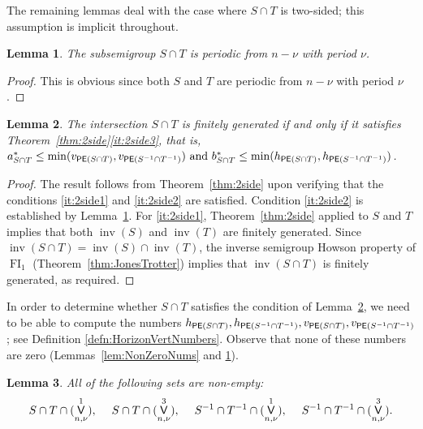 \documentclass[reqno]{amsart}
\theoremstyle{plain}
\newtheorem{lem}{Lemma}[section]
\theoremstyle{definition}
\DeclareMathOperator{\inv}{inv}
\DeclareMathOperator{\FI}{FI}
\let\P\relax
\DeclareMathOperator{\P}{\textup{\textsf{P}}}
\DeclareMathOperator{\PE}{\textup{\textsf{PE}}}
\DeclareMathOperator{\V}{\textup{\textsf{V}}}
\numberwithin{equation}{section}
\begin{document}
The remaining lemmas deal
with the case where $S\cap T$ is two-sided; this assumption is implicit throughout.

\begin{lem}
\label{lem:FGIP2SideIntersectPeriod}
The subsemigroup $S\cap T$ is periodic from $n-\nu$ with period $\nu$.
\end{lem}
\begin{proof}
This is obvious since both $S$ and $T$ are periodic from $n-\nu$ with period $\nu$.
\end{proof}


\begin{lem}
\label{lem:FGIP2sideIntersect1}
The intersection $S\cap T$ is finitely generated if and only if it satisfies Theorem~\ref{thm:2side}\ref{it:2side3}, that is, $a_{S\cap T}^\ast \leq \min(v_{\PE(S\cap T)}, v_{\PE(S^{-1}\cap T^{-1})}) \text{ and } b_{S\cap T}^\ast \leq \min(h_{\PE(S\cap T)}, h_{\PE(S^{-1}\cap T^{-1})})$.
\end{lem}

\begin{proof}
The result follows from Theorem~\ref{thm:2side} upon verifying that the conditions \ref{it:2side1} and \ref{it:2side2} are satisfied. Condition \ref{it:2side2} is established by Lemma~\ref{lem:FGIP2SideIntersectPeriod}. For \ref{it:2side1}, Theorem~\ref{thm:2side} applied to $S$ and $T$ implies that both $\inv(S)$ and $\inv(T)$ are finitely generated. Since $\inv(S\cap T) = \inv(S)\cap \inv(T)$, the inverse semigroup Howson property of $\FI_1$ (Theorem~\ref{thm:JonesTrotter}) implies that $\inv(S\cap T)$ is finitely generated, as required.
\end{proof}

In order to determine whether 
$S\cap T$ satisfies the condition of Lemma~\ref{lem:FGIP2sideIntersect1},
we need to be able to compute the numbers $h_{\PE(S\cap T)}, h_{\PE(S^{-1}\cap T^{-1})}, v_{\PE(S\cap T)}, v_{\PE(S^{-1}\cap T^{-1})}$; see Definition \ref {defn:HorizonVertNumbers}.
Observe that none of these numbers are zero (Lemmas~\ref{lem:NonZeroNums} and \ref{lem:FGIP2SideIntersectPeriod}).

\begin{lem}
\label{lem:FGIP2sideIntersect2}
All of the following sets are non-empty: 
\[
S\cap T\cap \P(\V_{n,\nu}^1),\quad\; S\cap T\cap\P(\V_{n,\nu}^3),\quad\; S^{-1}\cap T^{-1}\cap \P(\V_{n,\nu}^1),\quad\; S^{-1}\cap T^{-1}\cap \P(\V_{n,\nu}^3).
\]
\end{lem}
\end{document}
